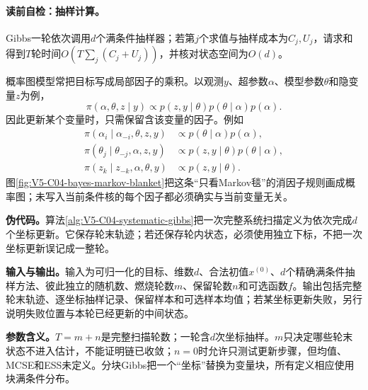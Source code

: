 \paragraph{读前自检：抽样计算。}Gibbs一轮依次调用$d$个满条件抽样器；若第$j$个求值与抽样成本为$C_j,U_j$，请求和得到$T$轮时间$O(T\sum_j(C_j+U_j))$，并核对状态空间为$O(d)$。\par


概率图模型常把目标写成局部因子的乘积。以观测$y$、超参数$\alpha$、模型参数$\theta$和隐变量$z$为例，
\begin{equation}\label{eq:V5-C04-bayes-factorization}
\pi(\alpha,\theta,z\mid y)
\propto p(z,y\mid\theta)p(\theta\mid\alpha)p(\alpha).
\end{equation}
因此更新某个变量时，只需保留含该变量的因子。例如
\begin{align}
\pi(\alpha_i\mid\alpha_{-i},\theta,z,y)
&\propto p(\theta\mid\alpha)p(\alpha),\\
\pi(\theta_j\mid\theta_{-j},\alpha,z,y)
&\propto p(z,y\mid\theta)p(\theta\mid\alpha),\\
\pi(z_k\mid z_{-k},\alpha,\theta,y)
&\propto p(z,y\mid\theta).
\end{align}
图\ref{fig:V5-C04-bayes-markov-blanket}把这条“只看Markov毯”的消因子规则画成概率图；未写入当前条件核的每个因子都必须确实与当前变量无关。


\label{struct:V5-C04-CH19}
\textbf{伪代码。}算法\ref{alg:V5-C04-systematic-gibbs}把一次完整系统扫描定义为依次完成$d$个坐标更新。它保存轮末轨迹；若还保存轮内状态，必须使用独立下标，不把一次坐标更新误记成一整轮。

\label{struct:V5-C04-CH20}
\textbf{输入与输出。}输入为可归一化的目标、维数$d$、合法初值$x^{(0)}$、$d$个精确满条件抽样方法、彼此独立的随机数、燃烧轮数$m$、保留轮数$n$和可选函数$f$。输出包括完整轮末轨迹、逐坐标抽样记录、保留样本和可选样本均值；若某坐标更新失败，另行说明失败位置与本轮已经更新的中间状态。

\label{struct:V5-C04-CH21}
\textbf{参数含义。}$T=m+n$是完整扫描轮数；一轮含$d$次坐标抽样。$m$只决定哪些轮末状态不进入估计，不能证明链已收敛；$n=0$时允许只测试更新步骤，但均值、MCSE和ESS未定义。分块Gibbs把一个“坐标”替换为变量块，所有定义相应使用块满条件分布。

